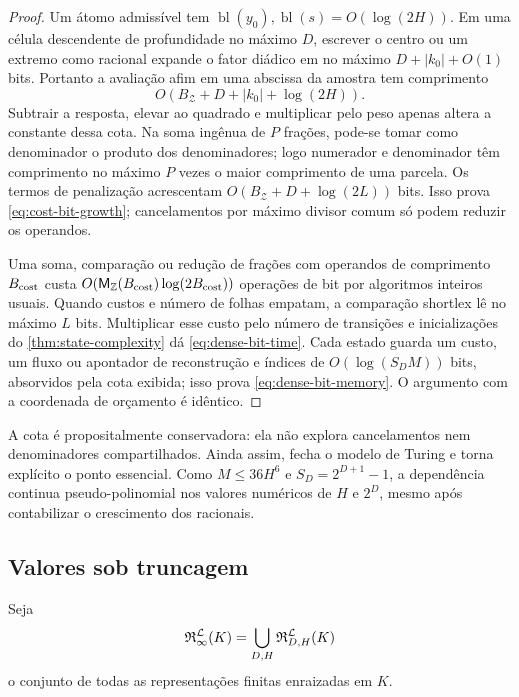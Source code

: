 \begin{proof}
Um átomo admissível tem $\operatorname{bl}(y_0),
\operatorname{bl}(s)=O(\log(2H))$. Em uma célula descendente de profundidade
no máximo $D$, escrever o centro ou um extremo como racional expande o fator
diádico em no máximo $D+|k_0|+O(1)$ bits. Portanto a avaliação afim em uma
abscissa da amostra tem comprimento
\[
 O(B_{\mathcal Z}+D+|k_0|+\log(2H)).
\]
Subtrair a resposta, elevar ao quadrado e multiplicar pelo peso apenas altera
a constante dessa cota. Na soma ingênua de $P$ frações, pode-se tomar como
denominador o produto dos denominadores; logo numerador e denominador têm
comprimento no máximo $P$ vezes o maior comprimento de uma parcela. Os termos
de penalização acrescentam $O(B_{\mathcal Z}+D+\log(2L))$ bits. Isso prova
\eqref{eq:cost-bit-growth}; cancelamentos por máximo divisor comum só podem
reduzir os operandos.

Uma soma, comparação ou redução de frações com operandos de comprimento
$B_{\rm cost}$ custa
$O(\mathsf M_{\mathbb Z}(B_{\rm cost})\log(2B_{\rm cost}))$ operações de bit
por algoritmos inteiros usuais. Quando custos e número de folhas empatam, a
comparação shortlex lê no máximo $L$ bits. Multiplicar esse custo pelo número
de transições e inicializações do \cref{thm:state-complexity} dá
\eqref{eq:dense-bit-time}. Cada estado guarda um custo, um fluxo ou apontador
de reconstrução e índices de $O(\log(S_DM))$ bits, absorvidos pela cota exibida;
isso prova \eqref{eq:dense-bit-memory}. O argumento com a coordenada de
orçamento é idêntico.
\end{proof}

A cota é propositalmente conservadora: ela não explora cancelamentos nem
denominadores compartilhados. Ainda assim, fecha o modelo de Turing e torna
explícito o ponto essencial. Como $M\le36H^6$ e $S_D=2^{D+1}-1$, a
dependência continua pseudo-polinomial nos valores numéricos de $H$ e $2^D$,
mesmo após contabilizar o crescimento dos racionais.

\subsection{Valores sob truncagem}

Seja
\[
 \mathfrak{R}_{\infty}^{\mathcal{L}}(K)
 =\bigcup_{D,H}\mathfrak{R}_{D,H}^{\mathcal{L}}(K)
\]
o conjunto de todas as representações finitas enraizadas em $K$.


